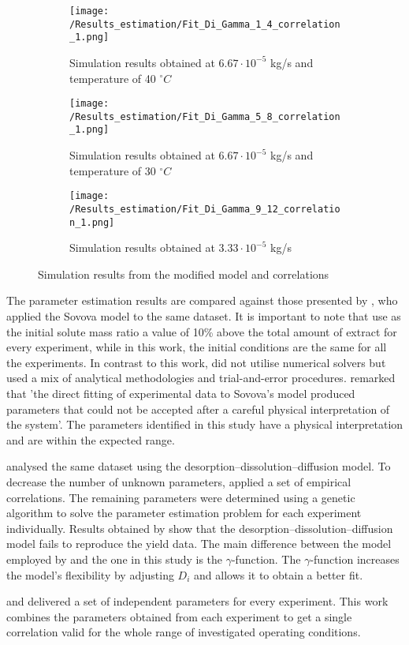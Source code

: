 \documentclass[../Supercritical_fluid_extraction_of_essential_oil_from_chamomile.tex]{subfiles}
\begin{document}
	\begin{figure}[!h]
		\centering
		\begin{subfigure}{0.9\columnwidth}
			\centering
			\texttt{[image: /Results\_estimation/Fit\_Di\_Gamma\_1\_4\_correlation\_1.png]}
			\caption{Simulation results obtained at $6.67\cdot 10^{-5}$ kg/s and temperature of 40 $^\circ C$}
			\label{fig: Fit_1_4_Di_Gamma_correlation}
		\end{subfigure}
		\hfill
		\begin{subfigure}{0.9\columnwidth}
			\centering
			\texttt{[image: /Results\_estimation/Fit\_Di\_Gamma\_5\_8\_correlation\_1.png]}
			\caption{Simulation results obtained at $6.67\cdot 10^{-5}$ kg/s and temperature of 30 $^\circ C$}
			\label{fig: Fit_5_8_Di_Gamma_correlation}
		\end{subfigure}
		\hfill
		\begin{subfigure}{0.9\columnwidth}
			\centering
			\texttt{[image: /Results\_estimation/Fit\_Di\_Gamma\_9\_12\_correlation\_1.png]}
			\caption{Simulation results obtained at $3.33 \cdot 10^{-5}$ kg/s}
			\label{fig: Fit_9_12_Di_Gamma_correlation}
		\end{subfigure}
		\caption{Simulation results from the modified model and correlations}
		\label{fig: Fit_Di_Gamma_correlation}
	\end{figure}
	
	The parameter estimation results are compared against those presented by \citet{Povh2001}, who applied the Sovova model to the same dataset. It is important to note that \citet{Povh2001} use as the initial solute mass ratio a value of 10\% above the total amount of extract for every experiment, while in this work, the initial conditions are the same for all the experiments. In contrast to this work, \citet{Povh2001} did not utilise numerical solvers but used a mix of analytical methodologies and trial-and-error procedures. \citet{Povh2001} remarked that 'the direct fitting of experimental data to Sovova's model produced parameters that could not be accepted after a careful physical interpretation of the system'. The parameters identified in this study have a physical interpretation and are within the expected range.
	
	\citet{Rahimi2011} analysed the same dataset using the desorption–dissolution–diffusion model. To decrease the number of unknown parameters, \citet{Rahimi2011} applied a set of empirical correlations. The remaining parameters were determined using a genetic algorithm to solve the parameter estimation problem for each experiment individually. Results obtained by \citet{Rahimi2011} show that the desorption–dissolution–diffusion model fails to reproduce the yield data. The main difference between the model employed by \citet{Rahimi2011} and the one in this study is the $\gamma$-function. The $\gamma$-function increases the model's flexibility by adjusting $D_i$ and allows it to obtain a better fit.
	
	\citet{Povh2001} and \citet{Rahimi2011} delivered a set of independent parameters for every experiment. This work combines the parameters obtained from each experiment to get a single correlation valid for the whole range of investigated operating conditions.
	
\end{document}
